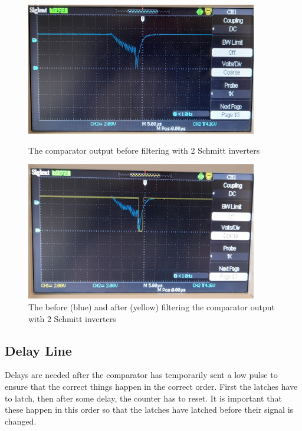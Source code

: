 \begin{figure} [H]
    \centering
    \begin{minipage}[t]{0.45\textwidth}
        \centering
        \includegraphics[width=0.9\textwidth]{images/comparatorTesting4.png}
        \caption{The comparator output before filtering with 2 Schmitt inverters}
        \label{fig:comparatorTesting4}
    \end{minipage}\hfill
    \begin{minipage}[t]{0.45\textwidth}
        \centering
        \includegraphics[width=0.9\textwidth]{images/comparatorTesting5.png}
        \caption{The before (blue) and after (yellow) filtering the comparator output with 2 Schmitt inverters}
         \label{fig:comparatorTesting5}
    \end{minipage}
\end{figure}

\subsection{Delay Line}
Delays are needed after the comparator has temporarily sent a low pulse to ensure that the correct things happen in the correct order. First the latches have to latch, then after some delay, the counter has to reset. It is important that these happen in this order so that the latches have latched before their signal is changed. 
